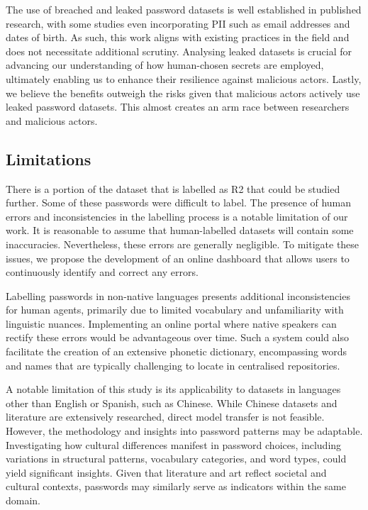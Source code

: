 The use of breached and leaked password datasets is well established in published research, with some studies even incorporating PII such as email addresses and dates of birth. As such, this work aligns with existing practices in the field and does not necessitate additional scrutiny. Analysing leaked datasets is crucial for advancing our understanding of how human-chosen secrets are employed, ultimately enabling us to enhance their resilience against malicious actors. Lastly, we believe the benefits outweigh the risks given that malicious actors actively use leaked password datasets. This almost creates an arm race between researchers and malicious actors.

\vspace*{-0.6cm}
\subsection{Limitations}
\vspace*{-0.2cm}

There is a portion of the dataset that is labelled as R2 that could be studied further. Some of these passwords were difficult to label.
The presence of human errors and inconsistencies in the labelling process is a notable limitation of our work. It is reasonable to assume that human-labelled datasets will contain some inaccuracies. Nevertheless, these errors are generally negligible. To mitigate these issues, we propose the development of an online dashboard that allows users to continuously identify and correct any errors.

Labelling passwords in non-native languages presents additional inconsistencies for human agents, primarily due to limited vocabulary and unfamiliarity with linguistic nuances. Implementing an online portal where native speakers can rectify these errors would be advantageous over time. Such a system could also facilitate the creation of an extensive phonetic dictionary, encompassing words and names that are typically challenging to locate in centralised repositories.

A notable limitation of this study is its applicability to datasets in languages other than English or Spanish, such as Chinese. While Chinese datasets and literature are extensively researched, direct model transfer is not feasible. However, the methodology and insights into password patterns may be adaptable. Investigating how cultural differences manifest in password choices, including variations in structural patterns, vocabulary categories, and word types, could yield significant insights. Given that literature and art reflect societal and cultural contexts, passwords may similarly serve as indicators within the same domain.


